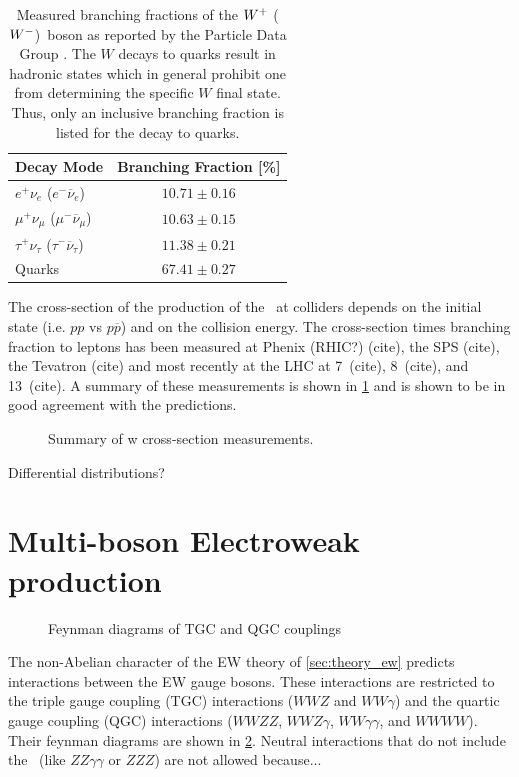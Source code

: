 \begin{table}[ht]
\centering
\begin{tabular}{l|c}
Decay Mode &  Branching Fraction [\%]\\
\hline
$e^+\nu_e$ ($e^-\overline{\nu}_e$) & $10.71 \pm 0.16$ \\
$\mu^+\nu_{\mu}$ ($\mu^-\overline{\nu}_{\mu}$) & $10.63 \pm 0.15$\\
$\tau^+\nu_{\tau}$ ($\tau^-\overline{\nu}_{\tau}$) & $11.38 \pm 0.21$\\
Quarks & $67.41 \pm 0.27$\\
\end{tabular}
\caption{Measured branching fractions of the $W^+$ ($W^-$)~boson 
as reported by the Particle Data Group \cite{PDG:2014}.  The $W$ decays
to quarks result in hadronic states which in general prohibit
one from determining the specific $W$ final state. Thus, only 
an inclusive branching fraction is listed for the decay to quarks.}
\label{tab:theory_wdecay}
\end{table}


The cross-section of the production of the \dubya~at colliders
depends on the initial state (i.e. $pp$ vs $p\overline{p}$) and on the
collision energy. 
The cross-section times branching fraction to leptons 
has been measured at Phenix (RHIC?) (cite), the SPS (cite), the Tevatron
(cite) and most recently at the LHC at 7~\TeV (cite), 8~\TeV (cite), 
and 13~\TeV(cite). A summary of these measurements is shown in 
\fig\ref{fig:theory_wxsec} and is shown to be in good agreement with 
the predictions.

\begin{figure}[ht]
\centering
\caption{Summary of w cross-section measurements.}
\label{fig:theory_wxsec}
\end{figure}

Differential distributions?


\section{Multi-boson Electroweak production}


\begin{figure}[ht]
\centering
\caption{Feynman diagrams of TGC and QGC couplings}
\label{fig:theory_feynman_couplings}
\end{figure}

The non-Abelian character of the 
EW theory of \sec\ref{sec:theory_ew} predicts interactions
between the EW gauge bosons. These interactions are restricted
to the triple gauge coupling (TGC) interactions ($WWZ$ and $WW\gamma$)
and the quartic gauge coupling (QGC) interactions ($WWZZ$, $WWZ\gamma$,
$WW\gamma\gamma$, and $WWWW$). Their feynman diagrams 
are shown in \fig\ref{fig:theory_feynman_couplings}.
Neutral interactions that do not include the \dubya~(like $ZZ\gamma\gamma$ or $ZZZ$)
are not allowed because... %

